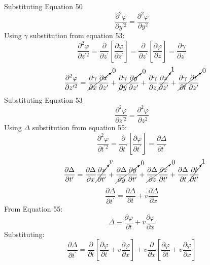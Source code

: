 \documentclass[journal]{IEEEtran}
\begin{document}
Substituting Equation 50
\begin{equation}
\boxed{
\frac{\partial^2\varphi}{\partial y^{\prime 2}}=
\frac{\partial^2\varphi}{\partial y^2}
}
\end{equation}
Using \underline{$\gamma$} substitution from equation 53:
\begin{equation}
\frac{\partial^2\varphi}{\partial z^{\prime 2}} =
\frac{\partial}{\partial z^{\prime}}\left[\frac{\partial\varphi}
{\partial z^{\prime}}\right] = \frac{\partial}{\partial z^{\prime}}
\left[\frac{\partial\varphi}{\partial z} \right] =
\frac{\partial\gamma}{\partial z^{\prime}}
\end{equation}
\begin{equation}
\frac{\partial^2\varphi}{\partial z^{\prime 2}}=
\cancelto{0}{\frac{\partial\gamma}{\partial x}\frac{\partial x}
{\partial z^{\prime}}} +
\cancelto{0}{\frac{\partial\gamma}{\partial y}\frac{\partial y}
{\partial z^{\prime}}} +
\frac{\partial\gamma}{\partial z}
\cancelto{1}{\frac{\partial z}{\partial z^{\prime}}} +
\cancelto{0}{\frac{\partial\gamma}{\partial t}\frac{\partial t}
{\partial z^{\prime}}}
\end{equation}
Substituting Equation 53
\begin{equation}
\boxed{
\frac{\partial^2\varphi}{\partial z^{\prime 2}} =
\frac{\partial^2\varphi}{\partial z^2}
}
\end{equation}
Using \underline{$\Delta$} substitution from equation 55:
\begin{equation}
\frac{\partial^2\varphi}{\partial t^{\prime 2}}=
\frac{\partial}{\partial t^{\prime}}\left[\frac{\partial\varphi}
{\partial t^{\prime}}\right]=\frac{\partial\Delta}{\partial t^{\prime}}
\end{equation}
\begin{equation}
\frac{\partial\Delta}{\partial t^{\prime}}=\frac{\partial\Delta}
{\partial x}\cancelto{v}{\frac{\partial x}{\partial t^{\prime}}} +
\cancelto{0}{\frac{\partial\Delta}{\partial y}\frac{\partial y}
{\partial t^{\prime}}} +
\cancelto{0}{\frac{\partial\Delta}{\partial z}\frac{\partial z}
{\partial t^{\prime}}} +
\frac{\partial\Delta}{\partial t}
\cancelto{1}{\frac{\partial t}{\partial t^{\prime}}}
\end{equation}
\begin{equation}
\frac{\partial\Delta}{\partial t^{\prime}}=\frac{\partial\Delta}
{\partial t}+v\frac{\partial\Delta}{\partial x}
\end{equation}
From Equation 55:
\begin{equation}
\boxed{
\Delta\equiv\frac{\partial\varphi}{\partial t}+v\frac{\partial\varphi}
{\partial x}
}
\end{equation}
Substituting:
\begin{equation}
\frac{\partial\Delta}{\partial t^{\prime}}=\frac{\partial}{\partial t}
\left[\frac{\partial\varphi}{\partial t}+v\frac{\partial\varphi}
{\partial x}\right] +
v\frac{\partial}{\partial x}\left[\frac{\partial\varphi}{\partial t}
+v\frac{\partial\varphi}{\partial x}\right]
\end{equation}
\end{document}
